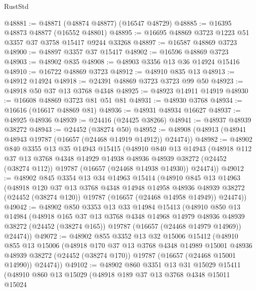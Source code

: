 \begin{lexlean}{RustStd}
\begin{coremodule}
@48881 := @48871 (@48874 @48877) (@16547 @48729)
@48885 := @16395 @48873 @48877 (@16552 @48801)
@48895 := @16695 @48869 @3723 @1223 @51 @3357 @37 @3758 @15417 @9244 @33268
@48897 := @16587 @48869 @3723
@48900 := @48897 @3357 @37 @15417
@48902 := @16596 @48869 @3723
@48903 := @48902 @835
@48908 := @48903 @3356 @13 @36 @14924 @15416
@48910 := @16722 @48869 @3723
@48912 := @48910 @835 @13
@48913 := @48912 @14924
@48918 := @24391 @48869 @3723 @3723 @99 @50
@48923 := @48918 @50 @37 @13 @3768 @4348
@48925 := @48923 @14911 @14919
@48930 := @16608 @48869 @3723 @81 @51 @81
@48931 := @48930 @3768
@48934 := @16616 (@16617 @48869 @81)
@48936 := @48931 @48934 @16627
@48937 := @48925 @48936
@48939 := @24416 (@24425 @38266)
@48941 := @48937 @48939 @38272
@48943 := @24452 (@38274 @50)
@48952 := @48908 (@48913 (@48941 @48943 @19787 (@16657 (@24468 @14919 @14912)) @24474))
@48982 := @48902
    @840
    @3355
    @13
    @35
    @14943
    @15415
    (@48910
      @840
      @13
      @14943
      (@48918
        @112
        @37
        @13
        @3768
        @4348
        @14929
        @14938
        @48936
        @48939
        @38272
        (@24452 (@38274 @112))
        @19787
        (@16657 (@24468 @14938 @14930))
        @24474))
@49012 := @48902
    @845
    @3354
    @13
    @34
    @14963
    @15414
    (@48910
      @845
      @13
      @14963
      (@48918
        @120
        @37
        @13
        @3768
        @4348
        @14948
        @14958
        @48936
        @48939
        @38272
        (@24452 (@38274 @120))
        @19787
        (@16657 (@24468 @14958 @14949))
        @24474))
@49042 := @48902
    @850
    @3353
    @13
    @33
    @14984
    @15413
    (@48910
      @850
      @13
      @14984
      (@48918
        @165
        @37
        @13
        @3768
        @4348
        @14968
        @14979
        @48936
        @48939
        @38272
        (@24452 (@38274 @165))
        @19787
        (@16657 (@24468 @14979 @14969))
        @24474))
@49072 := @48902
    @855
    @3352
    @13
    @32
    @15006
    @15412
    (@48910
      @855
      @13
      @15006
      (@48918
        @170
        @37
        @13
        @3768
        @4348
        @14989
        @15001
        @48936
        @48939
        @38272
        (@24452 (@38274 @170))
        @19787
        (@16657 (@24468 @15001 @14990))
        @24474))
@49102 := @48902
    @860
    @3351
    @13
    @31
    @15029
    @15411
    (@48910
      @860
      @13
      @15029
      (@48918
        @189
        @37
        @13
        @3768
        @4348
        @15011
        @15024

\end{coremodule}
\end{lexlean}

